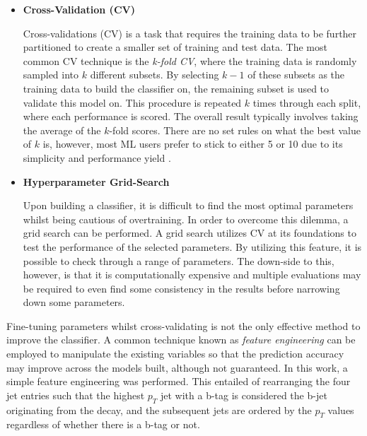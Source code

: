 \begin{itemize}
    \item \textbf{Cross-Validation (CV)} \par
    Cross-validations (CV) is a task that requires the training data to be further partitioned to create a smaller set of training and test data. The most common CV technique is the \textit{k-fold CV}, where the training data is randomly sampled into $k$ different subsets. By selecting $k-1$ of these subsets as the training data to build the classifier on, the remaining subset is used to validate this model on. This procedure is repeated $k$ times through each split, where each performance is scored. The overall result typically involves taking the average of the $k$-fold scores.  There are no set rules on what the best value of $k$ is, however, most ML users prefer to stick to either 5 or 10 due to its simplicity and performance yield \cite{james2013introduction}. \\
    
    \item \textbf{Hyperparameter Grid-Search} \par
    Upon building a classifier, it is difficult to find the most optimal parameters whilst being cautious of overtraining. In order to overcome this dilemma, a grid search can be performed. A grid search utilizes CV at its foundations to test the performance of the selected parameters. By utilizing this feature, it is possible to check through a range of parameters. The down-side to this, however, is that it is computationally expensive and multiple evaluations may be required to even find some consistency in the results before narrowing down some parameters. \\
    
\end{itemize}


Fine-tuning parameters whilst cross-validating is not the only effective method to improve the classifier. A common technique known as \textit{feature engineering} can be employed to manipulate the existing variables so that the prediction accuracy may improve across the models built, although not guaranteed. In this work, a simple feature engineering was performed. This entailed of rearranging the four jet entries such that the highest $p_T$ jet with a b-tag is considered the b-jet originating from the decay, and the subsequent jets are ordered by the $p_T$ values regardless of whether there is a b-tag or not. \\

